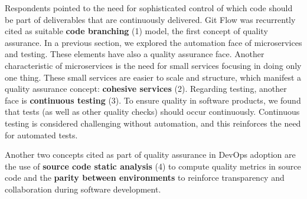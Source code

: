 Respondents pointed to the need for sophisticated control of which code should
be part of deliverables that are continuously delivered. Git Flow was
recurrently cited as suitable \textbf{code branching} (1) model, the first
concept of quality assurance.
In a previous section, we explored the automation face of
microservices and testing. These elements have also a quality assurance face.
Another characteristic of microservices is the need for small services focusing
in doing only one thing. These small services are easier to scale and
structure, which manifest a quality assurance concept: \textbf{cohesive
services} (2). Regarding testing, another face is \textbf{continuous
testing} (3). To ensure quality in software products, we found that
tests (as well as other quality checks) should occur continuously. Continuous testing
is considered challenging without automation, and this reinforces the need for automated
tests.

Another two concepts cited as part of quality assurance in DevOps adoption are
the use of \textbf{source code static analysis} (4) to compute quality metrics in
source code and the \textbf{parity between environments} to
reinforce transparency and collaboration during software development.

